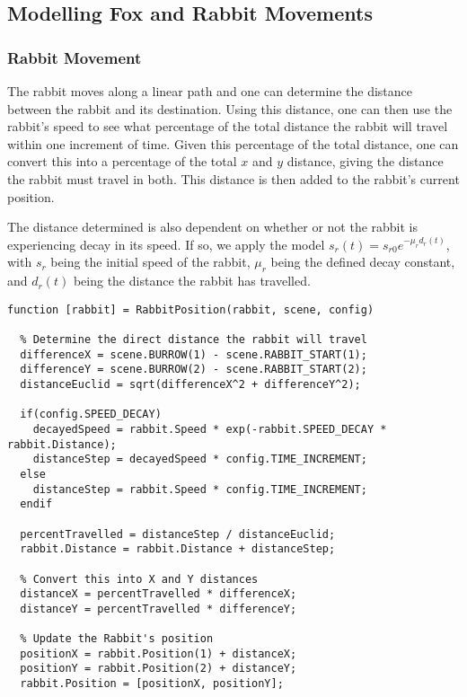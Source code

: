 \documentclass[11pt]{article}
\begin{document}
\subsection{Modelling Fox and Rabbit Movements}

\subsubsection{Rabbit Movement}  

The rabbit moves along a linear path and one can determine the distance between the rabbit and its destination. Using this distance, one can then use the rabbit's speed to see what percentage of the total distance the rabbit will travel within one increment of time. Given this percentage of the total distance, one can convert this into a percentage of the total $x$ and $y$ distance, giving the distance the rabbit must travel in both. This distance is then added to the rabbit's current position.

The distance determined is also dependent on whether or not the rabbit is experiencing decay in its speed. If so, we apply the model $s_r(t) = s_{r0}e^{-\mu_rd_r(t)}$, with $s_r$ being the initial speed of the rabbit, $\mu_r$ being the defined decay constant, and $d_r(t)$ being the distance the rabbit has travelled.

\bigskip

\begin{lstlisting}
function [rabbit] = RabbitPosition(rabbit, scene, config)
  
  % Determine the direct distance the rabbit will travel
  differenceX = scene.BURROW(1) - scene.RABBIT_START(1);
  differenceY = scene.BURROW(2) - scene.RABBIT_START(2);
  distanceEuclid = sqrt(differenceX^2 + differenceY^2);
   
  if(config.SPEED_DECAY)
    decayedSpeed = rabbit.Speed * exp(-rabbit.SPEED_DECAY * rabbit.Distance);
    distanceStep = decayedSpeed * config.TIME_INCREMENT;
  else
    distanceStep = rabbit.Speed * config.TIME_INCREMENT;
  endif
  
  percentTravelled = distanceStep / distanceEuclid; 
  rabbit.Distance = rabbit.Distance + distanceStep;

  % Convert this into X and Y distances
  distanceX = percentTravelled * differenceX;
  distanceY = percentTravelled * differenceY;
  
  % Update the Rabbit's position
  positionX = rabbit.Position(1) + distanceX;
  positionY = rabbit.Position(2) + distanceY;
  rabbit.Position = [positionX, positionY];
\end{lstlisting}
\end{document}
